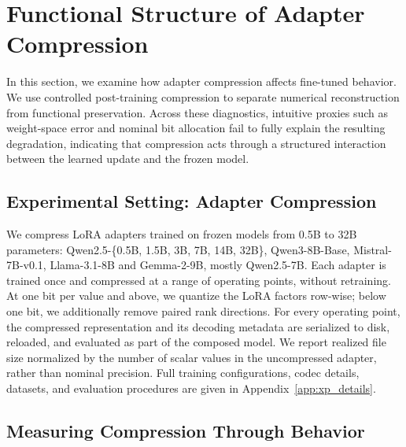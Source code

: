 \section{Functional Structure of Adapter Compression}
\label{sec:diagnostics}

In this section, we examine how adapter compression affects fine-tuned behavior. We use controlled post-training compression to separate numerical reconstruction from functional preservation. Across these diagnostics, intuitive proxies such as weight-space error and nominal bit allocation fail to fully explain the resulting degradation, indicating that compression acts through a structured interaction between the learned update and the frozen model.




\subsection{Experimental Setting: Adapter Compression}

We compress LoRA adapters trained on frozen models from 0.5B to 32B
parameters: Qwen2.5-\{0.5B, 1.5B, 3B, 7B, 14B, 32B\}, Qwen3-8B-Base,
Mistral-7B-v0.1, Llama-3.1-8B and Gemma-2-9B, mostly Qwen2.5-7B. Each
adapter is trained once and compressed at a range of operating points,
without retraining. At one bit per value and above, we
quantize the LoRA factors row-wise; below one bit, we additionally remove
paired rank directions. For every operating point, the compressed
representation and its decoding metadata are serialized to disk, reloaded,
and evaluated as part of the composed model. We report realized file size
normalized by the number of scalar values in the uncompressed adapter,
rather than nominal precision. Full training configurations, codec details,
datasets, and evaluation procedures are given in
Appendix~\ref{app:xp_details}.


\subsection{Measuring Compression Through Behavior}

